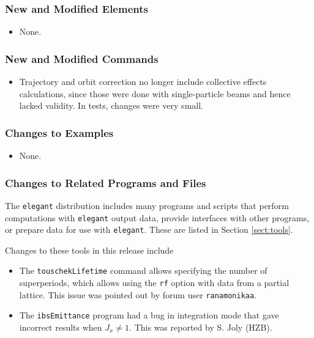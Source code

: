 \documentclass[11pt]{article}
\begin{document}
\subsubsection{New and Modified Elements}
\begin{itemize}
\item None.
\end{itemize}

\subsubsection{New and Modified Commands}
\begin{itemize}
\item Trajectory and orbit correction no longer include collective effects calculations, since those were done
  with single-particle beams and hence lacked validity. In tests, changes were very small.
\end{itemize}

\subsubsection{Changes to Examples}

\begin{itemize}
\item None.
\end{itemize}

\subsubsection{Changes to Related Programs and Files}

The {\tt elegant} distribution includes many programs and scripts that perform computations with {\tt elegant}
output data, provide interfaces with other programs, or prepare data for use with {\tt elegant}. These
are listed in Section \ref{sect:tools}. 

Changes to these tools in this release include
\begin{itemize}
\item The \verb|touschekLifetime| command allows specifying the number of superperiods, which allows using
  the \verb|rf| option with data from a partial lattice. This issue was pointed out by forum user \verb|ranamonikaa|.
\item The \verb|ibsEmittance| program had a bug in integration mode that gave incorrect results when $J_x \ne 1$.
  This was reported by S. Joly (HZB).
\end{itemize}
\end{document}
